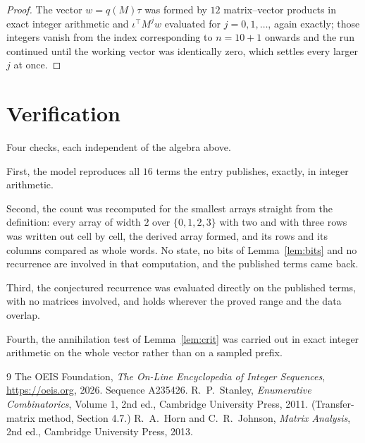 \documentclass[11pt,a4paper]{article}
\theoremstyle{plain}
\theoremstyle{definition}
\begin{document}
\begin{proof}
The vector $w=q(M)\tau$ was formed by $12$ matrix--vector products in exact integer
arithmetic and $\iota^{\!\top}M^{j}w$ evaluated for $j=0,1,\dots$, again exactly; those
integers vanish from the index corresponding to $n=10+1$ onwards and the run continued
until the working vector was identically zero, which settles every larger $j$ at once.
\end{proof}

\section{Verification}

Four checks, each independent of the algebra above.

First, the model reproduces all $16$ terms the entry publishes, exactly, in integer
arithmetic.

Second, the count was recomputed for the smallest arrays straight from the definition: every
array of width $2$ over $\{0,1,2,3\}$ with two and with three rows was written out cell by cell,
the derived array formed, and its rows and its columns compared as whole words. No state, no
bits of Lemma~\ref{lem:bits} and no recurrence are involved in that computation, and the
published terms came back.

Third, the conjectured recurrence was evaluated directly on the published terms, with no
matrices involved, and holds wherever the proved range and the data overlap.

Fourth, the annihilation test of Lemma~\ref{lem:crit} was carried out in exact integer
arithmetic on the whole vector rather than on a sampled prefix.

\begin{thebibliography}{9}
 The OEIS Foundation, \emph{The On-Line Encyclopedia of Integer
Sequences}, \url{https://oeis.org}, 2026. Sequence A235426.
 R.~P.~Stanley, \emph{Enumerative Combinatorics}, Volume 1, 2nd ed.,
Cambridge University Press, 2011. (Transfer-matrix method, Section 4.7.)
 R.~A.~Horn and C.~R.~Johnson, \emph{Matrix Analysis}, 2nd ed., Cambridge
University Press, 2013.
\end{thebibliography}
\end{document}
